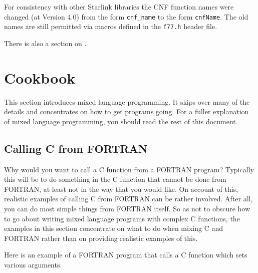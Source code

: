 \documentclass[twoside,11pt,nolof]{starlink}
\newcounter{examples}
\begin{document}
For consistency with other Starlink libraries the CNF function names were
changed (at Version 4.0) from the form \texttt{cnf\_name} to the form
\texttt{cnfName}.
The old names are still permitted via macros defined in the \texttt{f77.h}
header file.

There is also a section \latex{(\ref{compiling_and_linking})} on
.


\section{Cookbook}

This section
introduces mixed language programming. It skips over many of the
details and concentrates on how to get programs going. For a fuller explanation
of mixed language programming, you should read the rest of this document.

\subsection{\label{cook_f2c}Calling C from FORTRAN}

Why would you want to call a C function from a FORTRAN program? Typically this
will be to do something in the C function that cannot be done from FORTRAN, at
least not in the way that you would like. On account of this, realistic
examples of calling C from FORTRAN can be rather involved. After all, you can
do most simple things from FORTRAN itself. So as not to obscure how to go about
writing mixed language programs with complex C functions, the examples in this
section concentrate on what to do when mixing C and FORTRAN rather than on
providing realistic examples of this.

Here is an example of a FORTRAN program that calls a C function which sets
various arguments.
\end{document}
